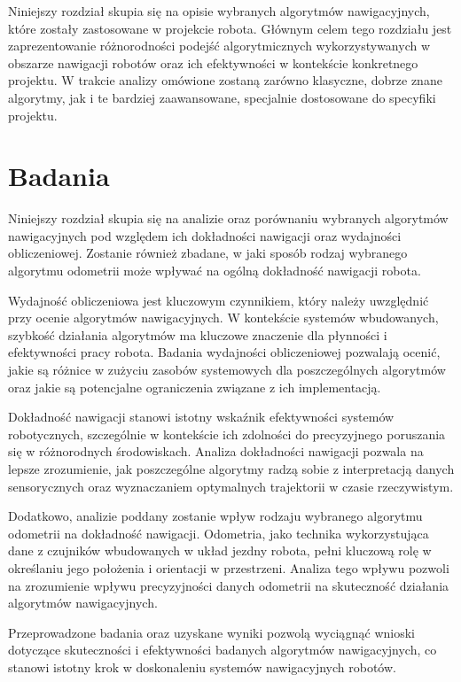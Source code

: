 \documentclass[12pt,twoside]{article}
\begin{document}
Niniejszy rozdział skupia się na opisie wybranych algorytmów nawigacyjnych, które zostały zastosowane w projekcie robota. Głównym celem tego rozdziału jest zaprezentowanie różnorodności podejść algorytmicznych wykorzystywanych w obszarze nawigacji robotów oraz ich efektywności w kontekście konkretnego projektu. W trakcie analizy omówione zostaną zarówno klasyczne, dobrze znane algorytmy, jak i te bardziej zaawansowane, specjalnie dostosowane do specyfiki projektu.

\section{Badania}

Niniejszy rozdział skupia się na analizie oraz porównaniu wybranych algorytmów nawigacyjnych pod względem ich dokładności nawigacji oraz wydajności obliczeniowej. Zostanie również zbadane, w jaki sposób rodzaj wybranego algorytmu odometrii może wpływać na ogólną dokładność nawigacji robota.

Wydajność obliczeniowa jest kluczowym czynnikiem, który należy uwzględnić przy ocenie algorytmów nawigacyjnych. W kontekście systemów wbudowanych, szybkość działania algorytmów ma kluczowe znaczenie dla płynności i efektywności pracy robota. Badania wydajności obliczeniowej pozwalają ocenić, jakie są różnice w zużyciu zasobów systemowych dla poszczególnych algorytmów oraz jakie są potencjalne ograniczenia związane z ich implementacją.

Dokładność nawigacji stanowi istotny wskaźnik efektywności systemów robotycznych, szczególnie w kontekście ich zdolności do precyzyjnego poruszania się w różnorodnych środowiskach. Analiza dokładności nawigacji pozwala na lepsze zrozumienie, jak poszczególne algorytmy radzą sobie z interpretacją danych sensorycznych oraz wyznaczaniem optymalnych trajektorii w czasie rzeczywistym.

Dodatkowo, analizie poddany zostanie wpływ rodzaju wybranego algorytmu odometrii na dokładność nawigacji. Odometria, jako technika wykorzystująca dane z czujników wbudowanych w układ jezdny robota, pełni kluczową rolę w określaniu jego położenia i orientacji w przestrzeni. Analiza tego wpływu pozwoli na zrozumienie wpływu precyzyjności danych odometrii na skuteczność działania algorytmów nawigacyjnych.

Przeprowadzone badania oraz uzyskane wyniki pozwolą wyciągnąć wnioski dotyczące skuteczności i efektywności badanych algorytmów nawigacyjnych, co stanowi istotny krok w doskonaleniu systemów nawigacyjnych robotów.
\end{document}
